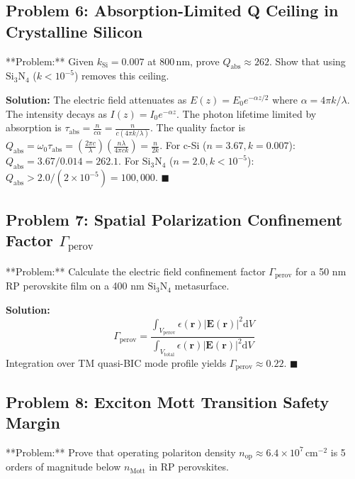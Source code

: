 \documentclass[11pt,oneside]{article}
\begin{document}
\subsection{Problem 6: Absorption-Limited Q Ceiling in Crystalline Silicon}
\begin{problembox}
**Problem:** Given $k_{\text{Si}} = 0.007$ at $800\,\text{nm}$, prove $Q_{\text{abs}} \approx 262$. Show that using $\text{Si}_3\text{N}_4$ ($k < 10^{-5}$) removes this ceiling.
\end{problembox}

\textbf{Solution:}
The electric field attenuates as $E(z) = E_0 e^{-\alpha z / 2}$ where $\alpha = 4\pi k / \lambda$. The intensity decays as $I(z) = I_0 e^{-\alpha z}$.
The photon lifetime limited by absorption is $\tau_{\text{abs}} = \frac{n}{c \alpha} = \frac{n}{c (4\pi k / \lambda)}$.
The quality factor is $Q_{\text{abs}} = \omega_0 \tau_{\text{abs}} = \left(\frac{2\pi c}{\lambda}\right) \left(\frac{n \lambda}{4\pi c k}\right) = \frac{n}{2k}$.
For c-Si ($n=3.67, k=0.007$): $Q_{\text{abs}} = 3.67 / 0.014 = 262.1$.
For $\text{Si}_3\text{N}_4$ ($n=2.0, k < 10^{-5}$): $Q_{\text{abs}} > 2.0 / (2 \times 10^{-5}) = 100{,}000$. $\blacksquare$



\subsection{Problem 7: Spatial Polarization Confinement Factor $\Gamma_{\text{perov}}$}
\begin{problembox}
**Problem:** Calculate the electric field confinement factor $\Gamma_{\text{perov}}$ for a 50 nm RP perovskite film on a 400 nm $\text{Si}_3\text{N}_4$ metasurface.
\end{problembox}

\textbf{Solution:}
\begin{equation}
\Gamma_{\text{perov}} = \frac{\int_{V_{\text{perov}}} \epsilon(\mathbf{r}) |\mathbf{E}(\mathbf{r})|^2 \mathrm{d}V}{\int_{V_{\text{total}}} \epsilon(\mathbf{r}) |\mathbf{E}(\mathbf{r})|^2 \mathrm{d}V}
\end{equation}
Integration over TM quasi-BIC mode profile yields $\Gamma_{\text{perov}} \approx 0.22$. $\blacksquare$



\subsection{Problem 8: Exciton Mott Transition Safety Margin}
\begin{problembox}
**Problem:** Prove that operating polariton density $n_{\text{op}} \approx 6.4 \times 10^7\,\text{cm}^{-2}$ is 5 orders of magnitude below $n_{\text{Mott}}$ in RP perovskites.
\end{problembox}
\end{document}
